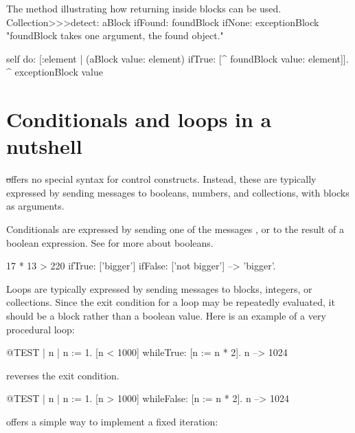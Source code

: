 \documentclass[a4paper,10pt,twoside]{book}
\begin{document}
\begin{method}[detectReturnBlock]{The method  illustrating how returning inside blocks can be used.}
Collection>>>detect: aBlock ifFound: foundBlock ifNone: exceptionBlock
   "foundBlock takes one argument, the found object."

   self do: [:element |
      (aBlock value: element) ifTrue: [^ foundBlock value: element]].
   ^ exceptionBlock value
\end{method}


\section{Conditionals and loops in a nutshell}

\st offers no special syntax for control constructs.
Instead, these are typically expressed by sending messages to booleans, numbers, and collections, with blocks as arguments.

Conditionals are expressed by sending one of the messages ,  or  to the result of a boolean expression.
See  for more about booleans.

\begin{code}{}
17 * 13 > 220
   ifTrue: ['bigger']
   ifFalse: ['not bigger'] --> 'bigger'.
\end{code}

Loops are typically expressed by sending messages to blocks, integers, or collections.
Since the exit condition for a loop may be repeatedly evaluated, it should be a block rather than a boolean value.
Here is an example of a very procedural loop:

\begin{code}{@TEST | n |}
n := 1.
[n < 1000] whileTrue: [n := n * 2].
n --> 1024
\end{code}

\noindent
{} reverses the exit condition.
\begin{code}{@TEST | n |}
n := 1.
[n > 1000] whileFalse: [n := n * 2].
n --> 1024
\end{code}

\noindent
{} offers a simple way to implement a fixed iteration:
\end{document}
